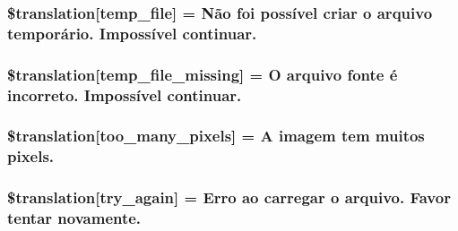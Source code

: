 \subsubsection[{\$translation}]{\setlength{\rightskip}{0pt plus 5cm}\$translation\mbox{[}\textquotesingle{}temp\+\_\+file\textquotesingle{}\mbox{]} = \textquotesingle{}Não foi possível criar o arquivo temporário. Impossível continuar.\textquotesingle{}}\label{class_8upload_8pt___b_r_8php_a2baece8da11e20d45175db91851ec3e3}
\hypertarget{class_8upload_8pt___b_r_8php_ab0fa87a88aba2624004581eed0633325}{}
\subsubsection[{\$translation}]{\setlength{\rightskip}{0pt plus 5cm}\$translation\mbox{[}\textquotesingle{}temp\+\_\+file\+\_\+missing\textquotesingle{}\mbox{]} = \textquotesingle{}O arquivo fonte é incorreto. Impossível continuar.\textquotesingle{}}\label{class_8upload_8pt___b_r_8php_ab0fa87a88aba2624004581eed0633325}
\hypertarget{class_8upload_8pt___b_r_8php_aa4051ef64e94a3f8295c63cf85544016}{}
\subsubsection[{\$translation}]{\setlength{\rightskip}{0pt plus 5cm}\$translation\mbox{[}\textquotesingle{}too\+\_\+many\+\_\+pixels\textquotesingle{}\mbox{]} = \textquotesingle{}A imagem tem muitos pixels.\textquotesingle{}}\label{class_8upload_8pt___b_r_8php_aa4051ef64e94a3f8295c63cf85544016}
\hypertarget{class_8upload_8pt___b_r_8php_a3afc377bd803683314f413a814243066}{}
\subsubsection[{\$translation}]{\setlength{\rightskip}{0pt plus 5cm}\$translation\mbox{[}\textquotesingle{}try\+\_\+again\textquotesingle{}\mbox{]} = \textquotesingle{}Erro ao carregar o arquivo. Favor tentar novamente.\textquotesingle{}}\label{class_8upload_8pt___b_r_8php_a3afc377bd803683314f413a814243066}
\hypertarget{class_8upload_8pt___b_r_8php_af368fee3b41bc05e6b208c1557a00c00}{}
